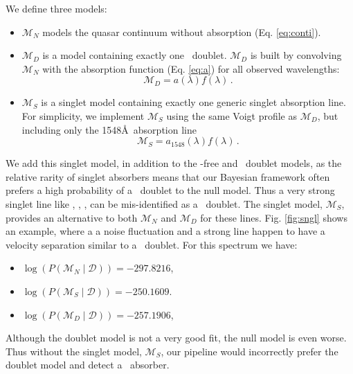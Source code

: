 \documentclass[fleqn,usenatbib]{mnras}
\newcommand{\civ}{\ion{C}{IV}}
\newcommand{\Data}{\mathcal{D}}
\newcommand{\model}{\mathcal{M}}
\begin{document}
We define three models:
\begin{itemize}
  \item $\model_{N}$ models the quasar continuum without absorption (Eq. \ref{eq:conti}).

\item $\model_{D}$ is a model containing
exactly one \civ\ doublet. $\model_D$ is built by convolving $\model_N$ with the absorption function (Eq. \ref{eq:a}) for all observed wavelengths:
\begin{equation}
  \model_{D} = a(\lambda) f(\lambda)\,.
  \label{eq:model_D}
\end{equation}

\item $\model_{S}$ is a singlet model containing exactly one generic singlet absorption line. For simplicity, we implement $\model_S$  using the same Voigt profile as $\model_D$, but including only the 1548\AA\ absorption line
\begin{equation}
  \model_{S} = a_{1548}(\lambda)  f(\lambda)\,.
  \label{eq:model_s}
\end{equation}
\end{itemize}

We add this singlet model, in addition to the \civ-free and \civ\ doublet models, as the relative rarity of singlet absorbers means that our Bayesian framework often prefers a high probability of a \civ\ doublet to the null model. Thus a very strong singlet line like
, , ,  can be mis-identified as a \civ\ doublet.
The singlet model, $\model_S$, provides an alternative to both $\model_N$ and $\model_D$ for these lines.
Fig. \ref{fig:sngl} shows an example, where a
a noise fluctuation and a strong line happen to have a velocity separation similar to a \civ\ doublet.
For this spectrum we have:
\begin{itemize}
\item $\log(P(\model_{N} \mid \Data))= -297.8216$,
 \item $\log(P(\model_S \mid \Data))= -250.1609$.
\item $\log(P(\model_D \mid \Data))= -257.1906$,
\end{itemize}
Although the doublet model is not a very good fit, the null model is even worse. Thus without the singlet model, $\model_S$, our pipeline would incorrectly prefer the doublet model and detect a \civ\ absorber.
\end{document}
